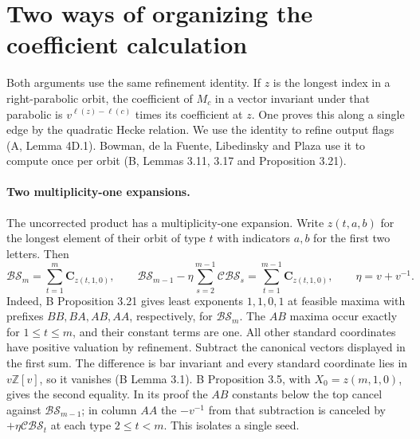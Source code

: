 \newpage
\section{Two ways of organizing the coefficient calculation}

Both arguments use the same refinement identity. If \(z\) is the longest index in a right-parabolic orbit, the coefficient of \(M_c\) in a vector invariant under that parabolic is \(v^{\ell(z)-\ell(c)}\) times its coefficient at \(z\). One proves this along a single edge by the quadratic Hecke relation. We use the identity to refine output flags (A, Lemma 4D.1). Bowman, de la Fuente, Libedinsky and Plaza use it to compute once per orbit (B, Lemmas 3.11, 3.17 and Proposition 3.21).

\paragraph{Two multiplicity-one expansions.}
The uncorrected product has a multiplicity-one expansion. Write \(z(t,a,b)\) for the longest element of their orbit of type \(t\) with indicators \(a,b\) for the first two letters. Then
\[
 \mathcal{BS}_m=\sum_{t=1}^m\mathbf C_{z(t,1,0)},\qquad
 \mathcal{BS}_{m-1}-\eta\sum_{s=2}^{m-1}\mathcal{CBS}_s
    =\sum_{t=1}^{m-1}\mathbf C_{z(t,1,0)},\qquad \eta=v+v^{-1}.
\]
Indeed, B Proposition 3.21 gives least exponents \(1,1,0,1\) at feasible maxima with prefixes \(BB,BA,AB,AA\), respectively, for \(\mathcal{BS}_m\). The \(AB\) maxima occur exactly for \(1\le t\le m\), and their constant terms are one. All other standard coordinates have positive valuation by refinement. Subtract the canonical vectors displayed in the first sum. The difference is bar invariant and every standard coordinate lies in \(v\mathbb Z[v]\), so it vanishes (B Lemma 3.1). B Proposition 3.5, with \(X_0=z(m,1,0)\), gives the second equality. In its proof the \(AB\) constants below the top cancel against \(\mathcal{BS}_{m-1}\); in column \(AA\) the \(-v^{-1}\) from that subtraction is canceled by \(+\eta\mathcal{CBS}_t\) at each type \(2\le t<m\). This isolates a single seed.


